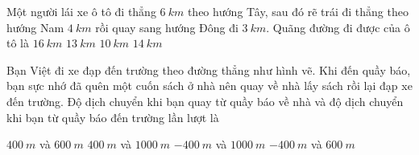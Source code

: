 \begin{ex}%
Một người lái xe ô tô đi thẳng $6\ km$ theo hướng Tây, sau đó rẽ trái đi thẳng theo hướng Nam $4\ km$ rồi quay sang hướng Đông đi $3\ km$. Quãng đường đi được của ô tô là
\choice
{$16\ km$}
{\True $13\ km$}
{$10\ km$}
{$14\ km$}
\loigiai{
}
\end{ex}
\begin{ex}%
Bạn Việt đi xe đạp đến trường theo đường thẳng như hình vẽ. Khi đến quầy báo, bạn sực nhớ đã quên một cuốn sách ở nhà nên quay về nhà lấy sách rồi lại đạp xe đến trường. Độ dịch chuyển khi bạn quay từ quầy báo về nhà và độ dịch chuyển khi bạn từ quầy báo đến trường lần lượt là
\begin{center}
\end{center}
\choice
{$400\ m$ và $600\ m$}
{$400\ m$ và $1000\ m$}
{$-400\ m$ và $1000\ m$}
{\True $-400\ m$ và $600\ m$}
\end{ex}

